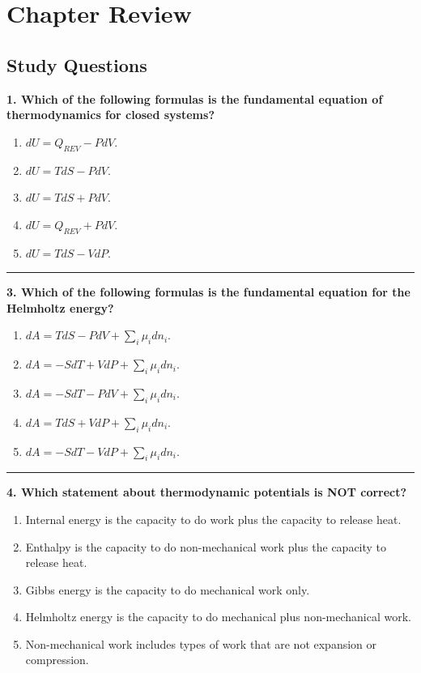 \documentclass[
  9pt,
]{extbook}
\providecommand{\tightlist}{%
  \setlength{\itemsep}{0pt}\setlength{\parskip}{0pt}}
\theoremstyle{definition}
\theoremstyle{definition}
\theoremstyle{definition}
\theoremstyle{definition}
\theoremstyle{remark}
\begin{document}
\section{Chapter Review}\label{rev8}

\subsection{Study Questions}\label{quest8}

\textbf{1. Which of the following formulas is the fundamental equation of thermodynamics for closed systems?}

\begin{enumerate}
\def\labelenumi{\alph{enumi}.}
\tightlist
\item
  \(dU = Q_{REV} - PdV\).
\item
  \(dU = TdS - PdV\).
\item
  \(dU = TdS + PdV\).
\item
  \(dU = Q_{REV} + PdV\).
\item
  \(dU = TdS - VdP\).
\end{enumerate}

\begin{center}\rule{0.5\linewidth}{0.5pt}\end{center}

\textbf{3. Which of the following formulas is the fundamental equation for the Helmholtz energy?}

\begin{enumerate}
\def\labelenumi{\alph{enumi}.}
\tightlist
\item
  \(dA = TdS - PdV + \sum_i \mu_i dn_i\).
\item
  \(dA = -SdT + VdP + \sum_i \mu_i dn_i\).
\item
  \(dA = -SdT - PdV + \sum_i \mu_i dn_i\).
\item
  \(dA = TdS + VdP + \sum_i \mu_i dn_i\).
\item
  \(dA = -SdT - VdP + \sum_i \mu_i dn_i\).
\end{enumerate}

\begin{center}\rule{0.5\linewidth}{0.5pt}\end{center}

\textbf{4. Which statement about thermodynamic potentials is NOT correct?}

\begin{enumerate}
\def\labelenumi{\alph{enumi}.}
\tightlist
\item
  Internal energy is the capacity to do work plus the capacity to release heat.
\item
  Enthalpy is the capacity to do non-mechanical work plus the capacity to release heat.
\item
  Gibbs energy is the capacity to do mechanical work only.
\item
  Helmholtz energy is the capacity to do mechanical plus non-mechanical work.
\item
  Non-mechanical work includes types of work that are not expansion or compression.
\end{enumerate}
\end{document}
